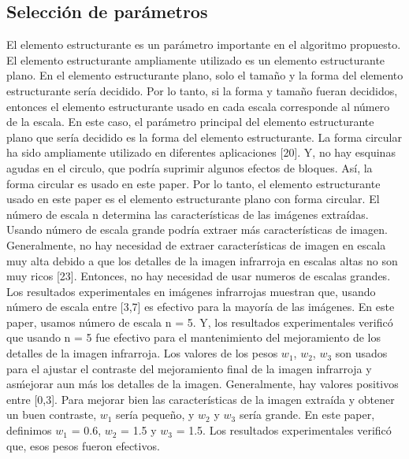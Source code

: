 \documentclass[a4paper, 11 pt, conference]{ieeeconf}      %
\begin{document}
\subsection{Selecci\'on de par\'ametros}
El elemento estructurante es un par\'ametro importante en el algoritmo propuesto. El elemento estructurante ampliamente utilizado es un elemento estructurante plano. En el elemento estructurante plano, solo el tamaño y la forma del elemento estructurante ser\'ia decidido. Por lo tanto, si la forma y tamaño fueran decididos, entonces el elemento estructurante usado en cada escala corresponde al n\'umero de la escala.  En este caso, el par\'ametro principal del elemento estructurante plano que ser\'ia decidido es la forma del elemento estructurante. La forma circular ha sido ampliamente utilizado en diferentes aplicaciones [20]. Y, no hay esquinas agudas en el circulo, que podr\'ia suprimir algunos efectos de bloques. As\'i, la forma circular es usado en este paper. Por lo tanto, el elemento estructurante usado en este paper es el elemento estructurante plano con forma circular.
El n\'umero de escala n determina las caracter\'isticas de las im\'agenes extra\'idas. Usando n\'umero de escala grande podr\'ia extraer m\'as caracter\'isticas de imagen. Generalmente, no hay necesidad de extraer caracter\'isticas de imagen en escala muy alta debido a que los detalles de la imagen infrarroja en escalas altas no son muy ricos [23]. Entonces, no hay necesidad de usar numeros de escalas grandes. Los resultados experimentales en im\'agenes infrarrojas muestran que, usando n\'umero de escala entre [3,7] es efectivo para la mayor\'ia de las im\'agenes. En este paper, usamos n\'umero de escala n = 5. Y, los resultados experimentales verific\'o que usando n = 5 fue efectivo para el mantenimiento del mejoramiento de los detalles de la imagen infrarroja.
Los valores de los pesos $w_1$, $w_2$, $w_3$ son usados para el ajustar el contraste del mejoramiento final de la imagen infrarroja y as\' mejorar aun m\'as los detalles de la imagen. Generalmente, hay valores positivos entre [0,3]. Para mejorar bien las caracter\'isticas de la imagen extra\'ida y obtener un buen contraste, $w_1$ ser\'ia pequeño, y $w_2$ y $w_3$ ser\'ia grande. En este paper, definimos $w_1$ = 0.6, $w_2$ = 1.5 y $w_3$ = 1.5. Los resultados experimentales verific\'o que, esos pesos fueron efectivos.
\end{document}
